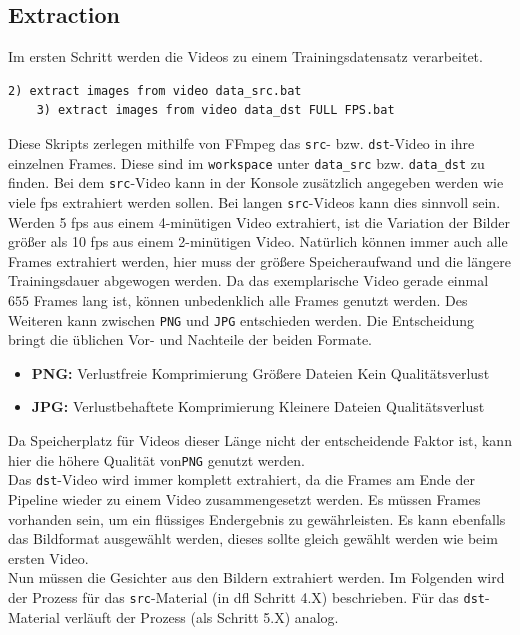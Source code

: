 \subsection{Extraction}\label{subsec:extraction}
Im ersten Schritt werden die Videos zu einem Trainingsdatensatz verarbeitet.
\begin{lstlisting}[label={lst:extraction-1},numbers=none]
    2) extract images from video data_src.bat
    3) extract images from video data_dst FULL FPS.bat
\end{lstlisting}
Diese Skripts zerlegen mithilfe von FFmpeg das \texttt{src}- bzw. \texttt{dst}-Video in ihre einzelnen Frames.
Diese sind im \texttt{workspace} unter \texttt{data\_src} bzw. \texttt{data\_dst} zu finden.
Bei dem \texttt{src}-Video kann in der Konsole zusätzlich angegeben werden wie viele \gls{fps} extrahiert werden sollen.
Bei langen \texttt{src}-Videos kann dies sinnvoll sein.
Werden 5 \gls{fps} aus einem 4-minütigen Video extrahiert, ist die Variation der Bilder größer als 10 \gls{fps} aus einem 2-minütigen Video.
Natürlich können immer auch alle Frames extrahiert werden, hier muss der größere Speicheraufwand und die längere Trainingsdauer abgewogen werden.
Da das exemplarische Video gerade einmal $655$ Frames lang ist, können unbedenklich alle Frames genutzt werden.
Des Weiteren kann zwischen \texttt{PNG} und \texttt{JPG} entschieden werden.
Die Entscheidung bringt die üblichen Vor- und Nachteile der beiden Formate.
\begin{itemize}
    \item \textbf{PNG:} Verlustfreie Komprimierung \rightarrow Größere Dateien \rightarrow Kein Qualitätsverlust
    \item \textbf{JPG:} Verlustbehaftete Komprimierung \rightarrow Kleinere Dateien \rightarrow Qualitätsverlust
\end{itemize}
Da Speicherplatz für Videos dieser Länge nicht der entscheidende Faktor ist, kann hier die höhere Qualität von\texttt{PNG} genutzt werden.\\
Das \texttt{dst}-Video wird immer komplett extrahiert, da die Frames am Ende der Pipeline wieder zu einem Video zusammengesetzt werden.
Es müssen Frames vorhanden sein, um ein flüssiges Endergebnis zu gewährleisten.
Es kann ebenfalls das Bildformat ausgewählt werden, dieses sollte gleich gewählt werden wie beim ersten Video.\\[0.5cm]

Nun müssen die Gesichter aus den Bildern extrahiert werden.
Im Folgenden wird der Prozess für das \texttt{src}-Material (in \gls{dfl} Schritt 4.X) beschrieben.
Für das \texttt{dst}-Material verläuft der Prozess (als Schritt 5.X) analog.

